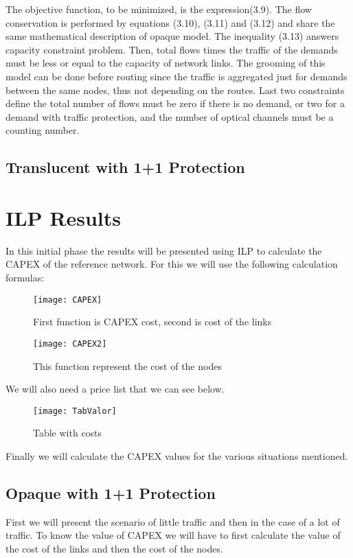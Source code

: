 The objective function, to be minimized, is the expression(3.9). The flow conservation is performed by equations (3.10), (3.11) and (3.12) and share the same mathematical description of opaque model. The inequality (3.13) answers capacity constraint problem. Then, total flows times the traffic of the demands must be less or equal to the capacity of network links. The grooming of this model can be done before routing since the traffic is aggregated just for demands between the same nodes, thus not depending on the routes. Last two constraints define the total number of flows must be zero if there is no demand, or two for a demand with traffic protection, and the number of optical channels must be a counting number.

\subsection{Translucent with 1+1 Protection}

\section{ILP Results}
In this initial phase the results will be presented using ILP to calculate the CAPEX of the reference network.
For this we will use the following calculation formulas:

\begin{figure}[h!]
  \centering
  \texttt{[image: CAPEX]}
  \caption{First function is CAPEX cost, second is cost of the links}
\end{figure}

\begin{figure}[h!]
  \centering
  \texttt{[image: CAPEX2]}
  \caption{This function represent the cost of the nodes}
\end{figure}

We will also need a price list that we can see below.

\begin{figure}[h!]
  \centering
  \texttt{[image: TabValor]}
  \caption{Table with costs}
\end{figure}

Finally we will calculate the CAPEX values for the various situations mentioned.

\subsection{Opaque with 1+1 Protection}
First we will present the scenario of little traffic and then in the case of a lot of traffic.
To know the value of CAPEX we will have to first calculate the value of the cost of the links and then the cost of the nodes.

